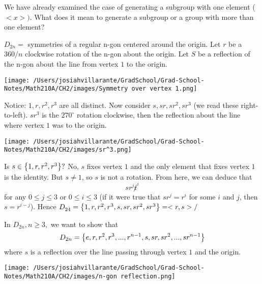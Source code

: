 We have already examined the case of generating a subgroup with one element ($<x>)$. What does it mean to generate a subgroup or a group with more than one element?

\begin{example}
    $D_{2n} = $ symmetries of a regular n-gon centered around the origin. Let $r$ be a $360/n$ clockwise rotation of the n-gon about the origin. Let $S$ be a reflection of the n-gon about the line from vertex $1$ to the origin.

    \texttt{[image: /Users/josiahvillarante/GradSchool/Grad-School-Notes/Math210A/CH2/images/Symmetry over vertex 1.png]}

    Notice: $1, r, r^2, r^3$ are all distinct. Now consider $s, sr, sr^2, sr^3$ (we read these right-to-left). $sr^3$ is the $270^\circ$ rotation clockwise, then the reflection about the line where vertex $1$ was to the origin.

    \texttt{[image: /Users/josiahvillarante/GradSchool/Grad-School-Notes/Math210A/CH2/images/sr^3.png]}

    Is $s \in \left\{1, r, r^2, r^3\right\}?$ No, $s$ fixes vertex $1$ and the only element that fixes vertex $1$ is the identity. But $s \not = 1$, so $s$ is not a rotation. From here, we can deduce that
    $$sr^j \not r^i$$
    for any $0 \leq j \leq 3$ or $0 \leq i \leq 3$ (if it were true that $sr^j = r^i$ for some $i$ and $j$, then $s = r^{i-j}$). Hence $D_{2\dot 4} = \left\{1, r, r^2, r^3, s, sr, sr^2, sr^3\right\} = <r, s>/$
\end{example}

In $D_{2n}, n \geq 3,$ we want to show that 
$$D_{2n} = \left\{e, r, r^2, r^3, ..., r^{n-1}, s, sr, sr^2, ..., sr^{n-1}\right\}$$
where $s$ is a reflection over the line passing through vertex $1$ and the origin.

\texttt{[image: /Users/josiahvillarante/GradSchool/Grad-School-Notes/Math210A/CH2/images/n-gon reflection.png]}

